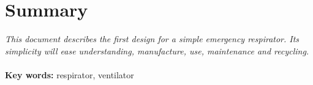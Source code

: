 \section*{Summary}
\textit{
    This document describes the first design for a simple emergency respirator. Its simplicity will ease understanding, manufacture, use, maintenance and recycling.
}\\
\\
\textbf{Key words:} respirator, ventilator